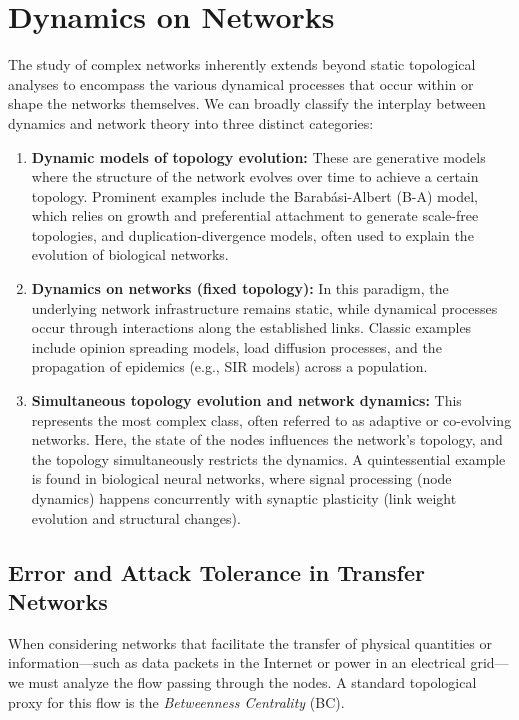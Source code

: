 \chapter{Dynamics on Networks}
\label{sec:dynamics_networks}

The study of complex networks inherently extends beyond static topological analyses to encompass the various dynamical processes that occur within or shape the networks themselves. We can broadly classify the interplay between dynamics and network theory into three distinct categories:

\begin{enumerate}
    \item \textbf{Dynamic models of topology evolution:} These are generative models where the structure of the network evolves over time to achieve a certain topology. Prominent examples include the Barabási-Albert (B-A) model, which relies on growth and preferential attachment to generate scale-free topologies, and duplication-divergence models, often used to explain the evolution of biological networks.
    \item \textbf{Dynamics on networks (fixed topology):} In this paradigm, the underlying network infrastructure remains static, while dynamical processes occur through interactions along the established links. Classic examples include opinion spreading models, load diffusion processes, and the propagation of epidemics (e.g., SIR models) across a population.
    \item \textbf{Simultaneous topology evolution and network dynamics:} This represents the most complex class, often referred to as adaptive or co-evolving networks. Here, the state of the nodes influences the network's topology, and the topology simultaneously restricts the dynamics. A quintessential example is found in biological neural networks, where signal processing (node dynamics) happens concurrently with synaptic plasticity (link weight evolution and structural changes).
\end{enumerate}

\section{Error and Attack Tolerance in Transfer Networks}
\label{subsec:error_attack_tolerance}

When considering networks that facilitate the transfer of physical quantities or information—such as data packets in the Internet or power in an electrical grid—we must analyze the flow passing through the nodes. A standard topological proxy for this flow is the \textit{Betweenness Centrality} (BC).

